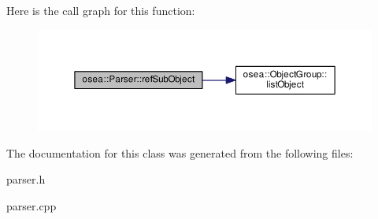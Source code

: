 Here is the call graph for this function\-:\nopagebreak
\begin{figure}[H]
\begin{center}
\leavevmode
\includegraphics[width=350pt]{classosea_1_1_parser_a4e0dcef1ae5785c46f2fb6d935090595_cgraph}
\end{center}
\end{figure}




The documentation for this class was generated from the following files\-:\begin{DoxyCompactItemize}
\item 
parser.\-h\item 
parser.\-cpp\end{DoxyCompactItemize}
